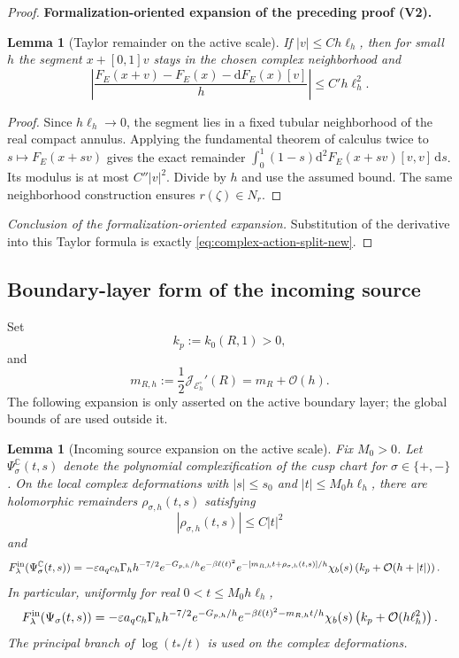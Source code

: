 \documentclass[11pt]{article}
\newtheorem{lemma}[theorem]{Lemma}
\newcommand{\formalisationparentid}{X}
\newenvironment{formalisationaddition}[1]{\par\medskip\begingroup\color{blue}\def\formalisationparentid{#1}\setcounter{formalizationsublemma}{0}\let\lemma\formalizationsublemma\let\endlemma\endformalizationsublemma
  \def\Eo{\mathcal E_h^\circ}\def\EE{\mathcal E_h}\def\phio{\phi_h^\circ}\def\phih{\phi_h}\def\Ho{H_h^{\rm atom}(v^\circ)}\def\Ha{H_h^{\rm atom}}\def\HL{H_h^{L}}\def\Dh{D_h}\def\Log{\operatorname{Log}}\def\ellh{\ell_h}\def\Gp{G_{p,h}}\def\Ast{A_{*,h}}\def\ahat{\widehat{\mathfrak a}_h}\def\ah{\mathfrak a_h}\def\rh{\widehat\rho_h}\def\deltah{\widehat\delta_h}\def\oldref##1{\textup{(##1)}}\def\interface##1{\par\noindent\textit{Analytical interface used here.} ##1\par}\def\finish{\par\noindent\textit{Conclusion of the formalization-oriented expansion.} }\par\noindent\textbf{Formalization-oriented expansion of the preceding proof (V2).}\par\smallskip
}{\par\endgroup\medskip
}
\newcommand{\C}{\mathbb C}
\newcommand{\eps}{\varepsilon}
\newcommand{\cE}{\mathcal E}
\newcommand{\cJ}{\mathcal J}
\newcommand{\cO}{\mathcal O}
\begin{document}
\begin{proof}
\begin{formalisationaddition}{C6.2}
\begin{lemma}[Taylor remainder on the active scale]\label{sublemma:C6-2-remainder}
If $|v|\le Ch\ellh$, then for small $h$ the segment $x+[0,1]v$ stays in the chosen complex neighborhood and
\[
 \left|\frac{F_E(x+v)-F_E(x)-\mathrm dF_E(x)[v]}h\right|
 \le C' h\ellh^2.
\]
\end{lemma}
\begin{proof}
Since $h\ellh\to0$, the segment lies in a fixed tubular neighborhood of the real compact annulus. Applying the fundamental theorem of calculus twice to $s\mapsto F_E(x+sv)$ gives the exact remainder
$\int_0^1(1-s)\mathrm d^2F_E(x+sv)[v,v]\,\mathrm ds$. Its modulus is at most $C''|v|^2$. Divide by $h$ and use the assumed bound. The same neighborhood construction ensures $r(\zeta)\in N_r$.
\end{proof}
\finish Substitution of the derivative into this Taylor formula is exactly \eqref{eq:complex-action-split-new}.
\end{formalisationaddition}

\end{proof}

\subsection{Boundary-layer form of the incoming source}\label{sec:boundary-layer}
Set
\[
 k_p:=k_0(R,1)>0,
\]
and
\begin{equation}\label{eq:mRh}
 m_{R,h}:=\frac12\cJ_{\cE_h^\circ}'(R)=m_R+\cO(h).
\end{equation}
The following expansion is only asserted on the active boundary layer; the
global bounds of  are used outside it.

\begin{lemma}[Incoming source expansion on the active scale]
\label{lem:incoming-boundary-layer}
Fix $M_0>0$.  Let $\Psi_\sigma^\C(t,s)$ denote the polynomial
complexification of the cusp chart for $\sigma\in\{+,-\}$.  On the local
complex deformations with $|s|\le s_0$ and $|t|\le M_0h\ell_h$, there are
holomorphic remainders $\rho_{\sigma,h}(t,s)$ satisfying
\begin{equation}\label{eq:incoming-action-remainder}
 |\rho_{\sigma,h}(t,s)|\le C|t|^2
\end{equation}
and
\begin{align}
 F_\lambda^{\rm in}(\Psi_\sigma^\C(t,s))
 &=-\eps a_qc_h\Gamma_hh^{-7/2}e^{-G_{p,h}/h}
 e^{-\beta\ell(t)^2}
 e^{-[m_{R,h}t+\rho_{\sigma,h}(t,s)]/h}\chi_b(s)
 \left(k_p+\cO(h+|t|)\right).
 \label{eq:incoming-complex-expansion}
\end{align}
In particular, uniformly for real $0<t\le M_0h\ell_h$,
\begin{equation}\label{eq:incoming-local-expansion}
 F_\lambda^{\rm in}(\Psi_\sigma(t,s))
 =-\eps a_qc_h\Gamma_hh^{-7/2}e^{-G_{p,h}/h}
 e^{-\beta\ell(t)^2-m_{R,h}t/h}\chi_b(s)
 \left(k_p+\cO(h\ell_h^2)\right).
\end{equation}
The principal branch of $\log(t_*/t)$ is used on the complex deformations.
\end{lemma}
\end{document}
